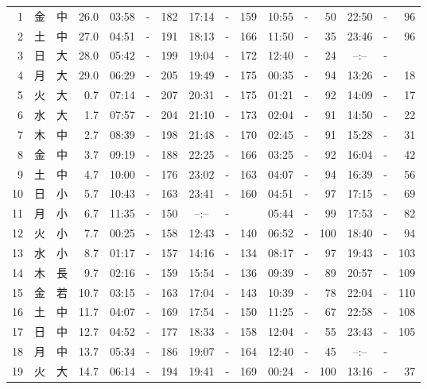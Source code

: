 \documentclass[12pt.a4j]{jsarticle}
\begin{document}
\begin{center}
\begin{table}[ht]
\begin{tabular}{|rc|cr|ccrccr|ccrccr|}
 \hline
 1 & 金 & 中 & 26.0 &  03:58 &-& 182  &  17:14 &-& 159  &   10:55 &-&  50  &   22:50 &-&  96  \\
 2 & 土 & 中 & 27.0 &  04:51 &-& 191  &  18:13 &-& 166  &   11:50 &-&  35  &   23:46 &-&  96  \\
 3 & 日 & 大 & 28.0 &  05:42 &-& 199  &  19:04 &-& 172  &   12:40 &-&  24  &   --:-- &-&     \\
 4 & 月 & 大 & 29.0 &  06:29 &-& 205  &  19:49 &-& 175  &   00:35 &-&  94  &   13:26 &-&  18  \\
 5 & 火 & 大 &  0.7 &  07:14 &-& 207  &  20:31 &-& 175  &   01:21 &-&  92  &   14:09 &-&  17  \\
 6 & 水 & 大 &  1.7 &  07:57 &-& 204  &  21:10 &-& 173  &   02:04 &-&  91  &   14:50 &-&  22  \\
 7 & 木 & 中 &  2.7 &  08:39 &-& 198  &  21:48 &-& 170  &   02:45 &-&  91  &   15:28 &-&  31  \\
 8 & 金 & 中 &  3.7 &  09:19 &-& 188  &  22:25 &-& 166  &   03:25 &-&  92  &   16:04 &-&  42  \\
 9 & 土 & 中 &  4.7 &  10:00 &-& 176  &  23:02 &-& 163  &   04:07 &-&  94  &   16:39 &-&  56  \\
10 & 日 & 小 &  5.7 &  10:43 &-& 163  &  23:41 &-& 160  &   04:51 &-&  97  &   17:15 &-&  69  \\
11 & 月 & 小 &  6.7 &  11:35 &-& 150  &  --:-- &-&     &   05:44 &-&  99  &   17:53 &-&  82  \\
12 & 火 & 小 &  7.7 &  00:25 &-& 158  &  12:43 &-& 140  &   06:52 &-& 100  &   18:40 &-&  94  \\
13 & 水 & 小 &  8.7 &  01:17 &-& 157  &  14:16 &-& 134  &   08:17 &-&  97  &   19:43 &-& 103  \\
14 & 木 & 長 &  9.7 &  02:16 &-& 159  &  15:54 &-& 136  &   09:39 &-&  89  &   20:57 &-& 109  \\
15 & 金 & 若 & 10.7 &  03:15 &-& 163  &  17:04 &-& 143  &   10:39 &-&  78  &   22:04 &-& 110  \\
16 & 土 & 中 & 11.7 &  04:07 &-& 169  &  17:54 &-& 150  &   11:25 &-&  67  &   22:58 &-& 108  \\
17 & 日 & 中 & 12.7 &  04:52 &-& 177  &  18:33 &-& 158  &   12:04 &-&  55  &   23:43 &-& 105  \\
18 & 月 & 中 & 13.7 &  05:34 &-& 186  &  19:07 &-& 164  &   12:40 &-&  45  &   --:-- &-&     \\
19 & 火 & 大 & 14.7 &  06:14 &-& 194  &  19:41 &-& 169  &   00:24 &-& 100  &   13:16 &-&  37  \\

\end{tabular}
\end{table}
\end{center}
\end{document}
